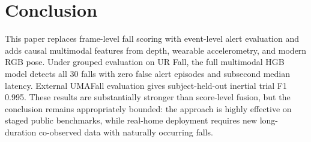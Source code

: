 \documentclass[journal]{IEEEtran}
\begin{document}
\section{Conclusion}
This paper replaces frame-level fall scoring with event-level alert evaluation and adds causal multimodal features from depth, wearable accelerometry, and modern RGB pose. Under grouped evaluation on UR Fall, the full multimodal HGB model detects all 30 falls with zero false alert episodes and subsecond median latency. External UMAFall evaluation gives subject-held-out inertial trial F1 0.995. These results are substantially stronger than score-level fusion, but the conclusion remains appropriately bounded: the approach is highly effective on staged public benchmarks, while real-home deployment requires new long-duration co-observed data with naturally occurring falls.



\end{document}
